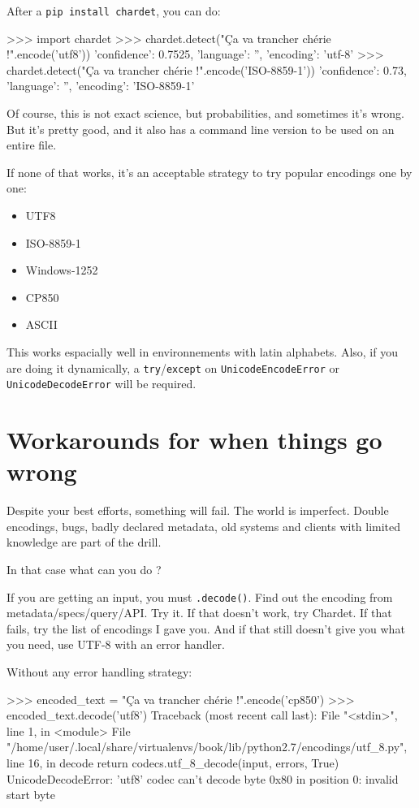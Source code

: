 After a \lstinline{pip install chardet}, you can do:

\begin{py2and3}
>>> import chardet
>>> chardet.detect("Ça va trancher chérie !".encode('utf8'))
{'confidence': 0.7525, 'language': '', 'encoding': 'utf-8'}
>>> chardet.detect("Ça va trancher chérie !".encode('ISO-8859-1'))
{'confidence': 0.73, 'language': '', 'encoding': 'ISO-8859-1'}
\end{py2and3}

Of course, this is not exact science, but probabilities, and sometimes it's wrong. But it's pretty good, and it also has a command line version to be used on an entire file.

If none of that works, it's an acceptable strategy to try popular encodings one by one:

\begin{itemize}
\item UTF8
\item ISO-8859-1
\item Windows-1252
\item CP850
\item ASCII
\end{itemize}

This works espacially well in environnements with latin alphabets. Also, if you are doing it dynamically, a \lstinline{try}/\lstinline{except} on \lstinline{UnicodeEncodeError} or \lstinline{UnicodeDecodeError} will be required.

\section{Workarounds for when things go wrong}

Despite your best efforts, something will fail. The world is imperfect. Double encodings, bugs, badly declared metadata, old systems and clients with limited knowledge are part of the drill.

In that case what can you do ?

If you are getting an input, you must \lstinline{.decode()}. Find out the encoding from metadata/specs/query/API. Try it. If that doesn't work, try Chardet. If that fails, try the list of encodings I gave you. And if that still doesn't give you what you need, use UTF-8 with an error handler.

Without any error handling strategy:

\begin{py3}
>>> encoded_text = "Ça va trancher chérie !".encode('cp850')
>>> encoded_text.decode('utf8')
Traceback (most recent call last):
  File "<stdin>", line 1, in <module>
  File "/home/user/.local/share/virtualenvs/book/lib/python2.7/encodings/utf_8.py", line 16, in decode
    return codecs.utf_8_decode(input, errors, True)
UnicodeDecodeError: 'utf8' codec can't decode byte 0x80 in position 0: invalid start byte
\end{py3}


